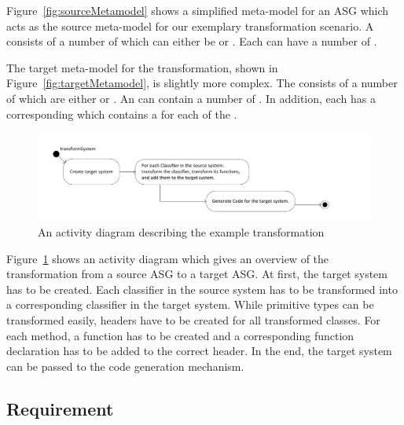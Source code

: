Figure~\ref{fig:sourceMetamodel} shows a simplified meta-model for an ASG which acts as the source meta-model for our exemplary transformation scenario. A  consists of a number of  which can either be  or . Each  can have a number of .

The target meta-model for the transformation, shown in Figure~\ref{fig:targetMetamodel}, is slightly more complex.
The  consists of a number of  which are either  or .
An  can contain a number of . In addition, each  has a corresponding  which contains a  for each  of the .


\begin{figure}[htbp]
\begin{center}
  \includegraphics[width=\textwidth]{figures/transformationOverview}
  \caption{An activity diagram describing the example transformation}
  \label{fig:transformationOverview}
\end{center}
\end{figure}

Figure~\ref{fig:transformationOverview} shows an activity diagram which gives an overview of the transformation from a source ASG to a target ASG.
At first, the target system has to be created. Each classifier in the source system has to be transformed into a corresponding classifier in the target system. While primitive types can be transformed easily, headers have to be created for all transformed classes. For each method, a function has to be created and a corresponding function declaration has to be added to the correct header. In the end, the target system can be passed to the code generation mechanism.

\subsection{Requirement}

